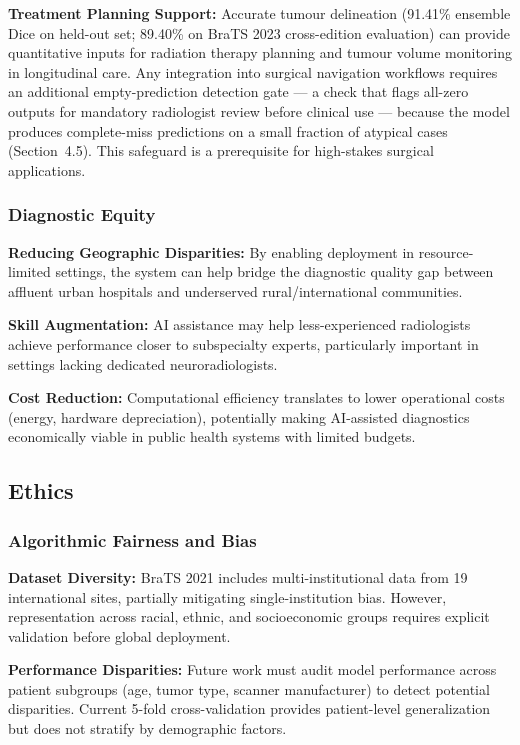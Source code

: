 \documentclass{article}
\begin{document}
\textbf{Treatment Planning Support:} Accurate tumour delineation (91.41\% ensemble Dice on held-out set; 89.40\% on BraTS 2023 cross-edition evaluation) can provide quantitative inputs for radiation therapy planning and tumour volume monitoring in longitudinal care. Any integration into surgical navigation workflows requires an additional empty-prediction detection gate — a check that flags all-zero outputs for mandatory radiologist review before clinical use — because the model produces complete-miss predictions on a small fraction of atypical cases (Section~4.5). This safeguard is a prerequisite for high-stakes surgical applications.

\subsubsection{Diagnostic Equity}

\textbf{Reducing Geographic Disparities:} By enabling deployment in resource-limited settings, the system can help bridge the diagnostic quality gap between affluent urban hospitals and underserved rural/international communities.

\textbf{Skill Augmentation:} AI assistance may help less-experienced radiologists achieve performance closer to subspecialty experts, particularly important in settings lacking dedicated neuroradiologists.

\textbf{Cost Reduction:} Computational efficiency translates to lower operational costs (energy, hardware depreciation), potentially making AI-assisted diagnostics economically viable in public health systems with limited budgets.


\subsection{Ethics}

\subsubsection{Algorithmic Fairness and Bias}

\textbf{Dataset Diversity:} BraTS 2021 includes multi-institutional data from 19 international sites, partially mitigating single-institution bias. However, representation across racial, ethnic, and socioeconomic groups requires explicit validation before global deployment.

\textbf{Performance Disparities:} Future work must audit model performance across patient subgroups (age, tumor type, scanner manufacturer) to detect potential disparities. Current 5-fold cross-validation provides patient-level generalization but does not stratify by demographic factors.
\end{document}

